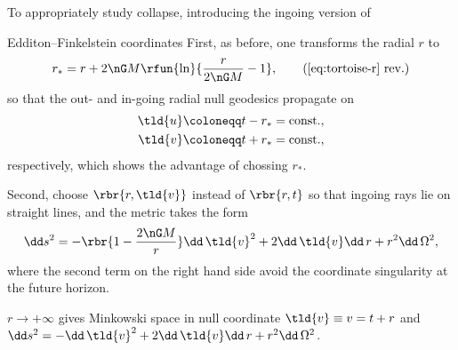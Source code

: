 To appropriately study collapse, introducing the ingoing version of
\begin{nameddef}{Edditon--Finkelstein coordinates}
First, as before, one transforms the radial $r$ to
\begin{equation}
r_* = r + 2\nG M \rfun{\ln}{\frac{r}{2\nG M} -1},
\tag{\ref{eq:tortoise-r} rev.}
\end{equation}
so that the out- and in-going radial null geodesics propagate on
\begin{align}
\tld{u} &\coloneqq t - r_* = \text{const.}, \\
\tld{v} &\coloneqq t + r_* = \text{const.},
\end{align}
respectively, which shows the advantage of chossing $r_*$.

Second, choose $\rbr{r, \tld{v}}$ instead of $\rbr{r, t}$ so that ingoing rays
lie on straight lines, and the metric takes the form
\begin{equation}
\dd s^2 = -\rbr{1-\frac{2\nG M}{r}}\dd\,\tld{v}^2 + 2\dd\,\tld{v}\dd\, r
+ r^2\dd\,\Omega^2,
\end{equation}
where the second term on the right hand side avoid the coordinate singularity
at the future horizon.
\end{nameddef} %

\begin{unamedrem}
$r\to+\infty$ gives Minkowski space in null coordinate $\tld{v}
\equiv v = t+r$ and $\dd s^2 = -\dd\,\tld{v}^2 + 2\dd\,\tld{v}\dd\, r
+ r^2\dd\,\Omega^2$.
\end{unamedrem}

